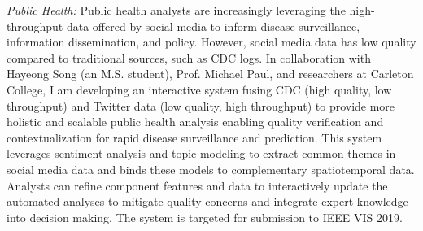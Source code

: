 \documentclass[11pt]{article}
\begin{document}
\emph{Public Health:} Public health analysts are increasingly leveraging the high-throughput data offered by social media to inform disease surveillance, information dissemination, and policy. However, social media data has low quality compared to traditional sources, such as CDC logs. In collaboration with Hayeong Song (an M.S. student), Prof. Michael Paul, and researchers at Carleton College, I am developing an interactive system fusing CDC (high quality, low throughput) and Twitter data (low quality, high throughput) to provide more holistic and scalable public health analysis enabling quality verification and contextualization for rapid disease surveillance and prediction. %
This system leverages sentiment analysis and topic modeling to extract common themes in social media data and binds these models to complementary spatiotemporal data. Analysts can refine component features and data to interactively update the automated analyses to mitigate quality concerns and integrate expert knowledge into decision making. The system is targeted for submission to IEEE VIS 2019.
\end{document}

